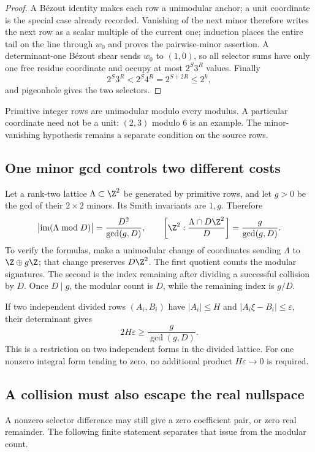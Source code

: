 \documentclass[11pt]{article}
\begin{document}
\begin{proof}
A B\'ezout identity makes each row a unimodular anchor; a unit coordinate is the special case already recorded.  Vanishing of the
next minor therefore writes the next row as a scalar multiple of the current
one; induction places the entire tail on the line through $w_0$ and proves the
pairwise-minor assertion.  A determinant-one B\'ezout shear sends $w_0$ to
$(1,0)$, so all selector sums have only one free residue coordinate and occupy
at most $2^S3^R$ values.  Finally
\[
 2^S3^R<2^S4^R=2^{S+2R}\le2^k,
\]
and pigeonhole gives the two selectors.
\end{proof}

Primitive integer rows are unimodular modulo every modulus.  A particular
coordinate need not be a unit: $(2,3)$ modulo $6$ is an example.  The
minor-vanishing hypothesis remains a separate condition on the source rows.

\subsection{One minor gcd controls two different costs}

Let a rank-two lattice $\Lambda\subset\Z^2$ be generated by primitive rows,
and let $g>0$ be the gcd of their $2\times2$ minors.  Its Smith invariants are
$1,g$.  Therefore
\[
 \bigl|\operatorname{im}(\Lambda\bmod D)\bigr|
       =\frac{D^2}{\gcd(g,D)},\qquad
 \left[\Z^2:\frac{\Lambda\cap D\Z^2}{D}\right]
       =\frac{g}{\gcd(g,D)}.
\]
To verify the formulas, make a unimodular change of coordinates sending
$\Lambda$ to $\Z\oplus g\Z$; that change preserves $D\Z^2$.
The first quotient counts the modular signatures.  The second is the index
remaining after dividing a successful collision by $D$.
Once $D\mid g$, the modular count is $D$, while the remaining index is $g/D$.

If two independent divided rows $(A_i,B_i)$ have $|A_i|\le H$ and
$|A_i\xi-B_i|\le\varepsilon$, their determinant gives
\[
 2H\varepsilon\ge \frac{g}{\gcd(g,D)}.
\]
This is a restriction on two independent forms in the divided lattice.
For one nonzero integral form tending to zero, no additional product
$H\varepsilon\to0$ is required.

\subsection{A collision must also escape the real nullspace}

A nonzero selector difference may still give a zero coefficient pair, or
zero real remainder.  The following finite statement separates that issue
from the modular count.
\end{document}

